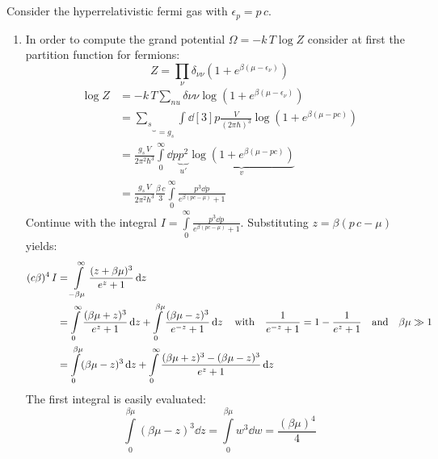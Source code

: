 \documentclass[11pt,a4paper]{scrartcl}
\newcommand{\gs}{g_{s}}
\begin{document}
\section{}

Consider the hyperrelativistic fermi gas with $\epsilon_{p}=p\,c$.

\begin{enumerate}[label=\textbf{\large(\alph*)}, itemsep=2\baselineskip]

\item
    In order to compute the grand potential $\Omega=-k\,T\log{Z}$ consider at
    first the partition function for fermions:
    \begin{equation*}
        Z=\prod_{\nu}\delta_{\nu\nu}\left(1+e^{\beta(\mu-\epsilon_{\nu})}\right)
    \end{equation*}
    \begin{align*}
        \log{Z}&=-k\,T\sum_{nu}\delta{\nu\nu}\log(1+e^{\beta(\mu-\epsilon_{\nu})})
        \\
        &=\underbrace{\sum_{s}}_{=\gs}\int\dd[3]{p}\frac{V}{(2\pi\hbar)^3}
        \log(1+e^{\beta(\mu-pc)}) \\
        &=\frac{\gs\,V}{2\pi^2\hbar^3}\int\limits_{0}^{\infty}\dd{p}
        \underbrace{p^2}_{u'}
        \underbrace{\log(1+e^{\beta(\mu-pc)})}_{v} \\
        &=\frac{\gs\,V}{2\pi^2\hbar^3}\frac{\beta\,c}{3}\int\limits_{0}^{\infty}\frac{p^3\dd{p}}{e^{\beta(pc-\mu)}+1}
    \end{align*}
    Continue with the integral
    $\displaystyle
        I=\int\limits_{0}^{\infty}\frac{p^3\dd{p}}{e^{\beta(pc-\mu)}+1}
    $.
    Substituting $z=\beta(p\,c-\mu)$ yields:
    \begin{align*}
        (c\beta)^4\,I&=\int\limits_{-\beta\mu}^{\infty}\frac{(z+\beta\mu)^3}{e^z+1}\dd{z}
        \\
        &=\int\limits_{0}^{\infty}\frac{(\beta\mu+z)^3}{e^z+1}\dd{z}+\int\limits_{0}^{\beta\mu}\frac{(\beta\mu-z)^3}{e^{-z}+1}\dd{z}
        \qq{with}\frac{1}{e^{-z}+1}=1-\frac{1}{e^z+1}\qq{and}\beta\mu\gg{1} \\
        &=\int\limits_{0}^{\beta\mu}(\beta\mu-z)^3\dd{z}+\int\limits_{0}^{\infty}\frac{(\beta\mu+z)^3-(\beta\mu-z)^3}{e^z+1}\dd{z}
    \end{align*}
    The first integral is easily evaluated:
    \begin{equation*}
        \int\limits_{0}^{\beta\mu}(\beta\mu-z)^3\dd{z}=\int\limits_{0}^{\beta\mu}w^3\dd{w}=\frac{(\beta\mu)^4}{4}
    \end{equation*}

\end{enumerate}
\end{document}
